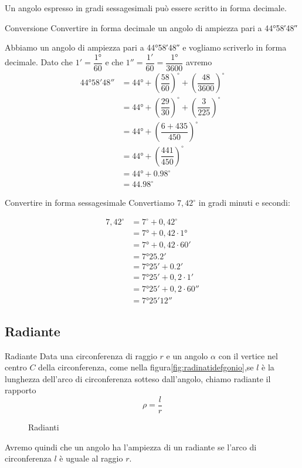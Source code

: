 Un angolo espresso in gradi sessagesimali può essere scritto in forma decimale. 
\begin{esempiot}{Conversione}{}
Convertire in forma decimale un angolo di ampiezza pari a \ang{44;58;48}
\end{esempiot}
 Abbiamo un angolo di ampiezza pari a \ang{44;58;48} e vogliamo
 scriverlo in forma decimale. Dato che $\ang{;1;}=\dfrac{\ang{1}}{60}$ e che $\ang{;;1}=\dfrac{\ang{;1;}}{60}=\dfrac{\ang{1}}{3600}$  avremo
\begin{align*}
	\ang{44;58;48}&=\ang{44}+\left(\dfrac{58}{60}\right)^{\circ}+\left(\dfrac{48}{3600} \right)^{\circ}\\
	&=\ang{44}+\left(\dfrac{29}{30}\right)^{\circ}+\left(\dfrac{3}{225} \right)^{\circ}\\
	&=\ang{44}+\left(\dfrac{6+435}{450} \right)^{\circ}\\
	&=\ang{44}+\left(\dfrac{441}{450} \right)^{\circ}\\
	&=\ang{44}+\num{0,98}^{\circ}\\
	&=\num{44,98}^{\circ}
\end{align*}
\begin{esempiot}{Convertire in forma sessagesimale}{}
Convertiamo $7,42^{\circ}$ in gradi minuti e secondi:
\end{esempiot}
\begin{align*}
	7,42^{\circ}&=7^{\circ}+0,42^{\circ}\\
	&=\ang{7}+0,42\cdot \ang{1}\\
	&=\ang{7}+0,42\cdot \ang{;60;}\\
	&=\ang{7;25,2;}\\
	&=\ang{7;25;}+\ang{;0,2;}\\
	&=\ang{7;25;}+0,2\cdot\ang{;1;}\\
	&=\ang{7;25;}+0,2\cdot\ang{;;60}\\
	&=\ang{7;25;12}
\end{align*} 

\subsection{Radiante}
\begin{definizionet}{Radiante}{}
Data una circonferenza di raggio $r$ e  un angolo $\alpha$ con il vertice nel centro $C$ della circonferenza, come nella figura\nobs\vref{fig:radinatidefgonio},se $l$ è la lunghezza dell'arco di circonferenza sotteso dall'angolo, chiamo radiante il rapporto \[\rho=\dfrac{l}{r} \]
\end{definizionet}
\begin{figure}
	\centering
	
	\caption{Radianti}
	\label{fig:radinatidefgonio}
\end{figure}
Avremo quindi che un angolo ha l'ampiezza di un radiante se l'arco di circonferenza $l$ è uguale al raggio $r$.

